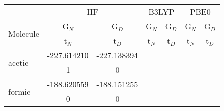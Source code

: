 \begin{tabular}{lcccccc}
\toprule
 & \multicolumn{2}{c}{HF} & \multicolumn{2}{c}{B3LYP} & \multicolumn{2}{c}{PBE0} \\
\cmidrule(lr){2-3} \cmidrule(lr){4-5} \cmidrule(lr){6-7}
\multirow{2}{*}{Molecule} & G$_N$ & G$_D$ & G$_N$ & G$_D$ & G$_N$ & G$_D$ \\
 & t$_N$ & t$_D$ & t$_N$ & t$_D$ & t$_N$ & t$_D$ \\
\midrule
\multirow{2}{*}{acetic} & -227.614210 & -227.138394 \\
  & 1 & 0 \\
\multirow{2}{*}{formic} & -188.620559 & -188.151255 \\
  & 0 & 0 \\
\bottomrule
\end{tabular}